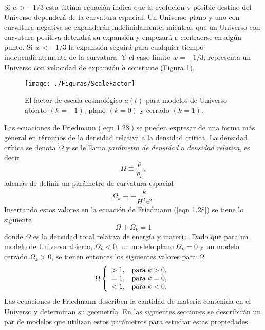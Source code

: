 \documentclass[a4paper,openright,12pt]{book}
\begin{document}
Si $w > -1/3$ esta última ecuación indica que la evolución y posible destino del Universo dependerá de la curvatura espacial. Un Universo plano y uno con curvatura negativa se expanderán indefinidamente, mientras que un Universo con curvatura positiva detendrá su expansión y empezará a contraerse en algún punto. Si $w < -1/3$ la expansión seguirá para cualquier tiempo independientemente de la curvatura. Y el caso límite $w = - 1/3$, representa un Universo con velocidad de expansión $\dot{a}$ constante (Figura \ref{fig 1.1}).
\begin{figure}
\centering
    \texttt{[image: ./Figuras/ScaleFactor]}
  \caption{\footnotesize{El factor de escala cosmológico $a(t)$ para modelos de Universo abierto $(k = -1)$, plano $(k = 0)$ y cerrado $(k = 1)$.}}
  \label{fig 1.1}
\end{figure}

Las ecuaciones de Friedmann  (\ref{eqn 1.28}) se pueden expresar de una forma más general en términos de la densidad relativa a la densidad crítica. La densidad crítica se denota $\Omega$ y se le llama \textit{parámetro de densidad} o \textit{densidad relativa}, es decir
\begin{equation}
\Omega \equiv \frac{\rho}{\rho_{c}},\label{eqn 1.38}
\end{equation}
además de definir un parámetro de curvatura espacial
\begin{equation}
\Omega_{k} \equiv -\frac{k}{H^{2}a^{2}}.\label{eqn 1.39}
\end{equation}
Insertando estos valores en la ecuación de Friedmann (\ref{eqn 1.28}) se tiene lo siguiente
\begin{equation}
\Omega + \Omega_{k} = 1\label{eqn 1.40}
\end{equation}
donde $\Omega$ es la densidad total relativa de energía y materia. Dado que para un modelo de Universo abierto, $\Omega_{k} < 0$, un modelo plano $\Omega_{k} = 0 $ y un modelo cerrado $\Omega_{k} > 0$, se tienen entonces los siguientes valores para $\Omega$
\begin{equation}
\Omega  \left\lbrace
\begin{array}{ll}
> 1, & \textup{para} \; k > 0, \\
= 1, & \textup{para} \; k = 0, \\
< 1, & \textup{para} \; k < 0. \\ \label{eqn 1.41}
\end{array}
\right.
\end{equation}
Las ecuaciones de Friedmann describen la cantidad de materia contenida en el Universo y determinan su geometría. En las siguientes secciones se describirán un par de modelos que utilizan estos parámetros para estudiar estas propiedades.
\end{document}
